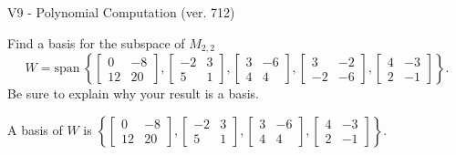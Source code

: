 \begin{exercise}
  \begin{exerciseTitle}V9 - Polynomial Computation (ver. 712)\end{exerciseTitle}
  \begin{exerciseStatement}
    Find a basis for the subspace of \(M_{2,2}\) 
\[W=\mathrm{span}\ \left\{\left[\begin{array}{cc}
0 & -8 \\
12 & 20
\end{array}\right] , \left[\begin{array}{cc}
-2 & 3 \\
5 & 1
\end{array}\right] , \left[\begin{array}{cc}
3 & -6 \\
4 & 4
\end{array}\right] , \left[\begin{array}{cc}
3 & -2 \\
-2 & -6
\end{array}\right] , \left[\begin{array}{cc}
4 & -3 \\
2 & -1
\end{array}\right]\right\}.\]
 Be sure to explain why your result is a basis.


  \end{exerciseStatement}
  \begin{exerciseAnswer}
   A basis of \(W\) is  \(\left\{\left[\begin{array}{cc}
0 & -8 \\
12 & 20
\end{array}\right] , \left[\begin{array}{cc}
-2 & 3 \\
5 & 1
\end{array}\right] , \left[\begin{array}{cc}
3 & -6 \\
4 & 4
\end{array}\right] , \left[\begin{array}{cc}
4 & -3 \\
2 & -1
\end{array}\right]\right\}\).
  


  \end{exerciseAnswer}
\end{exercise}